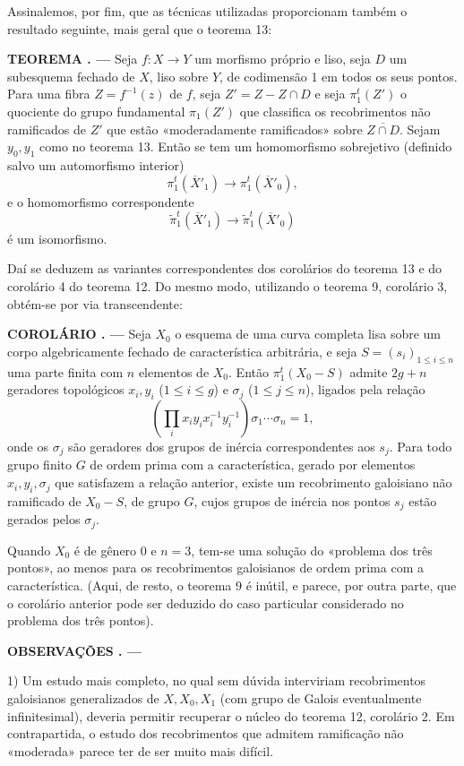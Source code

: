 \documentclass[11pt,twoside,openany]{book}
\numberwithin{equation}{section}
\newcommand{\src}[1]{%
  \phantomsection\hypertarget{src:#1}{}%
  \marginpar{\raggedleft\footnotesize\sffamily #1}%
}
\theoremstyle{plain}
\theoremstyle{definition}
\theoremstyle{remark}
\newcommand{\result}[2]{%
  \par\medskip\noindent\textbf{#1%
  \if\relax\detokenize{#2}\relax\else\space#2\fi. ---}\enspace
}
\newcommand{\FgaUnitKey}{frontmatter}
\renewcommand{\src}[1]{%
  \phantomsection\hypertarget{src:\FgaUnitKey:#1}{}%
  \marginpar{\raggedleft\footnotesize\sffamily #1}%
}
\begin{document}
Assinalemos, por fim, que as técnicas utilizadas proporcionam também o
resultado seguinte, mais geral que o teorema 13:

\result{TEOREMA}{14} Seja $f:X\longrightarrow Y$ um morfismo próprio e liso,
seja $D$ um subesquema fechado de $X$, liso sobre $Y$, de codimensão 1 em
todos os seus pontos. Para uma fibra $Z=f^{-1}(z)$ de $f$, seja $Z'=Z-Z\cap D$ e seja
$\pi_1^t(Z')$ o quociente do grupo fundamental $\pi_1(Z')$ que classifica os
recobrimentos não ramificados de $Z'$ que estão «moderadamente ramificados»
sobre $\overline{Z\cap D}$. Sejam $y_0,y_1$ como no teorema 13. Então se
tem um homomorfismo sobrejetivo (definido salvo um automorfismo interior)
\[
  \pi_1^t(\overline X'_1)\longrightarrow\pi_1^t(\overline X'_0),
\]
e o homomorfismo correspondente
\[
  \widetilde\pi_1^t(\overline X'_1)
  \longrightarrow\widetilde\pi_1^t(\overline X'_0)
\]
é um isomorfismo.

Daí se deduzem as variantes correspondentes dos corolários do
teorema 13 e do corolário 4 do teorema 12. Do mesmo modo, utilizando o
teorema 9, corolário 3, obtém-se por via transcendente:

\result{COROLÁRIO}{} Seja $X_0$ o esquema de uma curva completa lisa sobre um
corpo algebricamente fechado de característica arbitrária, e seja
$S=(s_i)_{1\le i\le n}$ uma parte finita com $n$ elementos de $X_0$. Então
$\pi_1^t(X_0-S)$ admite $2g+n$ geradores topológicos
$x_i,y_i$ ($1\le i\le g$) e $\sigma_j$ ($1\le j\le n$), ligados pela relação
\[
  \left(\prod_i x_i y_i x_i^{-1}y_i^{-1}\right)
  \sigma_1\cdots\sigma_n=1,
\]
onde os $\sigma_j$ são geradores dos grupos de inércia correspondentes
aos $s_j$. Para todo grupo finito $G$ de ordem prima com a característica,
gerado por elementos $x_i,y_i,\sigma_j$ que satisfazem a relação anterior,
existe um recobrimento galoisiano não ramificado de $X_0-S$, de grupo $G$, cujos
grupos de inércia nos pontos $s_j$ estão gerados pelos $\sigma_j$.

Quando $X_0$ é de gênero 0 e $n=3$, tem-se uma solução do «problema dos
três pontos», ao menos para os recobrimentos galoisianos de ordem prima com
a característica. (Aqui, de resto, o teorema 9 é inútil, e parece, por
outra parte, que o corolário anterior pode ser deduzido do caso particular
considerado no problema dos três pontos).

\src{220}
\result{OBSERVAÇÕES}{}

1) Um estudo mais completo, no qual sem dúvida interviriam recobrimentos
galoisianos generalizados de $X,X_0,X_1$ (com grupo de Galois eventualmente
infinitesimal), deveria permitir recuperar o núcleo do teorema 12, corolário
2. Em contrapartida, o estudo dos recobrimentos que admitem ramificação não
«moderada» parece ter de ser muito mais difícil.
\end{document}
